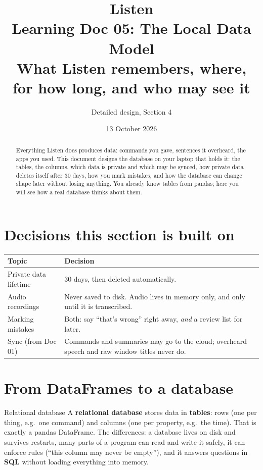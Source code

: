 \documentclass[11pt,a4paper]{article}
\title{\textbf{Listen}\\[4pt]\large Learning Doc 05: The Local Data Model\\
       \normalsize What Listen remembers, where, for how long, and who may see it}
\author{Detailed design, Section 4}
\date{13 October 2026}
\begin{document}
\maketitle

\begin{abstract}
\noindent Everything Listen does produces data: commands you gave, sentences it overheard, the
apps you used. This document designs the database on your laptop that holds it: the tables,
the columns, which data is private and which may be synced, how private data deletes itself
after 30 days, how you mark mistakes, and how the database can change shape later without
losing anything. You already know tables from pandas; here you will see how a real database
thinks about them.
\end{abstract}

\tableofcontents
\newpage

\section{Decisions this section is built on}
\begin{center}
\renewcommand{\arraystretch}{1.2}
\begin{tabularx}{\textwidth}{l X}
\toprule
\textbf{Topic} & \textbf{Decision} \\
\midrule
Private data lifetime & 30 days, then deleted automatically. \\
Audio recordings      & Never saved to disk. Audio lives in memory only, and only until it is transcribed. \\
Marking mistakes      & Both: say ``that's wrong'' right away, \emph{and} a review list for later. \\
Sync (from Doc 01)    & Commands and summaries may go to the cloud; overheard speech and raw window titles never do. \\
\bottomrule
\end{tabularx}
\end{center}

\section{From DataFrames to a database}

\begin{concept}{Relational database}
A \textbf{relational database} stores data in \textbf{tables}: rows (one per thing, e.g.\ one
command) and columns (one per property, e.g.\ the time). That is exactly a pandas DataFrame.
The differences: a database lives on disk and survives restarts, many parts of a program can
read and write it safely, it can enforce rules (``this column may never be empty''), and it
answers questions in \textbf{SQL} without loading everything into memory.
\end{concept}
\end{document}
